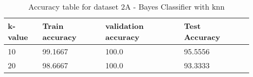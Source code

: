 \def\arraystretch{1.25}
\begin{table}[H]
\centering
\begin{tabular}{l l l l l}
\hline
\hline
\textbf{k-value} & \textbf{Train accuracy} & \textbf{validation accuracy} & \textbf{Test Accuracy}\\
\hline
\hline
10 & 99.1667 & 100.0 & 95.5556 \\
20 & 98.6667 & 100.0 & 93.3333 \\
\hline
\end{tabular}
\caption{Accuracy table for dataset 2A - Bayes Classifier with knn}
\end{table}